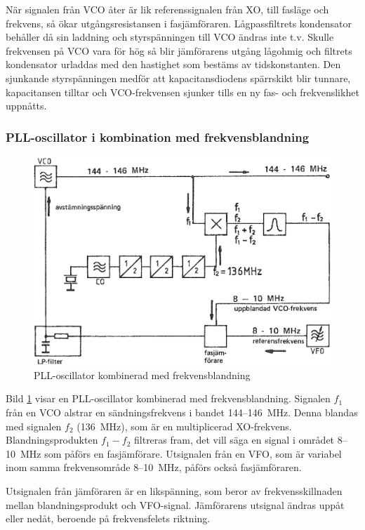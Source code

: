 När signalen från VCO åter är lik referenssignalen från XO, till
fasläge och frekvens, så ökar utgångsresistansen i fasjämföraren.
Lågpassfiltrets kondensator behåller då sin laddning
och styrspänningen till VCO ändras inte t.v.
Skulle frekvensen på VCO vara för hög så blir jämförarens utgång lågohmig och
filtrets kondensator urladdas med den hastighet som bestäms av tidskonstanten.
Den sjunkande styrspänningen medför att kapacitansdiodens spärrskikt blir
tunnare, kapacitansen tilltar och VCO-frekvensen sjunker tills en ny fas- och
frekvenslikhet uppnåtts.

\subsubsection{PLL-oscillator i kombination med frekvensblandning}

\begin{figure}
\includegraphics[width=\textwidth]{images/cropped_pdfs/bild_2_3-81.pdf}
\caption{PLL-oscillator kombinerad med frekvensblandning}
\label{fig:BildII3-81}
\end{figure}

Bild \ref{fig:BildII3-81} visar en PLL-oscillator kombinerad med
frekvensblandning.
Signalen \(f_1\) från en VCO alstrar en sändningsfrekvens i bandet
144--146~MHz.
Denna blandas med signalen \(f_2\) (136~MHz), som är en multiplicerad
XO-frekvens.
Blandningsprodukten \(f_1 - f_2\) filtreras fram, det vill säga en signal i
området 8--10~MHz som påförs en fasjämförare.
Utsignalen från en VFO, som är variabel inom samma frekvensområde 8--10~MHz,
påförs också fasjämföraren.

Utsignalen från jämföraren är en likspänning, som beror av frekvensskillnaden
mellan blandningsprodukt och VFO-signal.
Jämförarens utsignal ändras uppåt eller nedåt, beroende på frekvensfelets
riktning.

